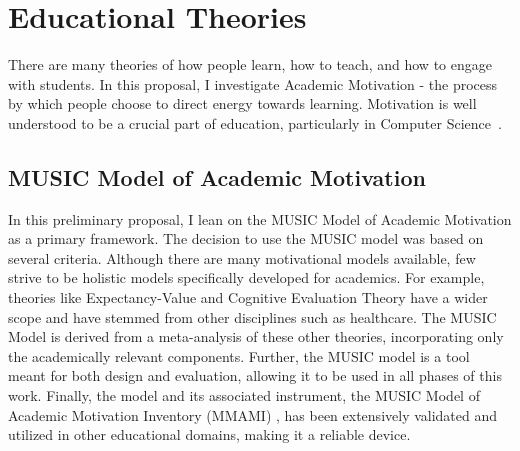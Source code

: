 \section{Educational Theories}

There are many theories of how people learn, how to teach, and how to engage with students. 
In this proposal, I investigate Academic Motivation - the process by which people choose to direct energy towards learning.
Motivation is well understood to be a crucial part of education, particularly in Computer Science~\cite{Carter:2011}.

\subsection{MUSIC Model of Academic Motivation}

In this preliminary proposal, I lean on the MUSIC Model of Academic Motivation as a primary framework.
The decision to use the MUSIC model was based on several criteria.
Although there are many motivational models available, few strive to be holistic models specifically developed for academics.
For example, theories like Expectancy-Value and Cognitive Evaluation Theory have a wider scope and have stemmed from other disciplines such as healthcare. %
The MUSIC Model is derived from a meta-analysis of these other theories, incorporating only the academically relevant components.
Further, the MUSIC model is a tool meant for both design and evaluation, allowing it to be used in all phases of this work.
Finally, the model and its associated instrument, the MUSIC Model of Academic Motivation Inventory (MMAMI) , has been extensively validated and utilized in other educational domains, making it a reliable device\cite{jones-validity}.

